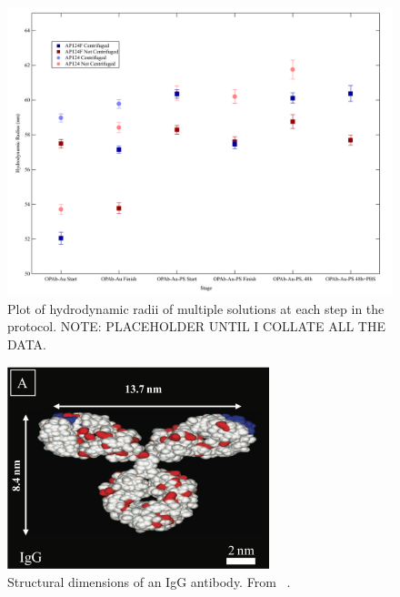 \begin{figure}[htbp]
\centering
\includegraphics[keepaspectratio,width=\textwidth,height=0.75\textheight]{2011DecPEGylation.pdf}
\caption{Plot of hydrodynamic radii of multiple solutions at each step in the protocol. NOTE: PLACEHOLDER UNTIL I COLLATE ALL THE DATA.}
\label{fullprotocol}
\end{figure}



\begin{figure}[htbp]
\centering
\includegraphics[keepaspectratio,width=3in,height=0.75\textheight]{iggstructure.pdf}
\caption{Structural dimensions of an IgG antibody. From ~\citep{antibodylength}.}
\label{iggstructure}
\end{figure}




